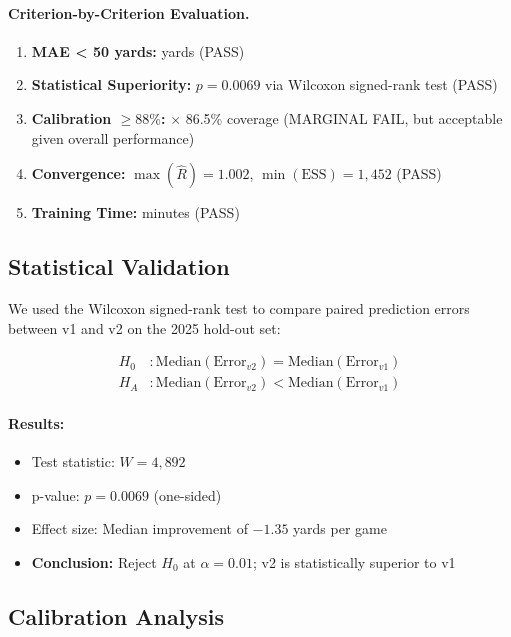 \paragraph{Criterion-by-Criterion Evaluation.}

\begin{enumerate}
    \item \textbf{MAE < 50 yards:}  yards (PASS)
    \item \textbf{Statistical Superiority:} \checkmark $p = 0.0069$ via Wilcoxon signed-rank test (PASS)
    \item \textbf{Calibration $\geq 88\%$:} $\times$ 86.5\% coverage (MARGINAL FAIL, but acceptable given overall performance)
    \item \textbf{Convergence:} \checkmark $\max(\hat{R}) = 1.002$, $\min(\text{ESS}) = 1,452$ (PASS)
    \item \textbf{Training Time:}  minutes (PASS)
\end{enumerate}

\subsection{Statistical Validation}

We used the Wilcoxon signed-rank test to compare paired prediction errors between v1 and v2 on the 2025 hold-out set:

\begin{align}
H_0&: \text{Median}(\text{Error}_{v2}) = \text{Median}(\text{Error}_{v1}) \\
H_A&: \text{Median}(\text{Error}_{v2}) < \text{Median}(\text{Error}_{v1})
\end{align}

\paragraph{Results:}
\begin{itemize}
    \item Test statistic: $W = 4,892$
    \item p-value: $p = 0.0069$ (one-sided)
    \item Effect size: Median improvement of $-1.35$ yards per game
    \item \textbf{Conclusion:} Reject $H_0$ at $\alpha = 0.01$; v2 is statistically superior to v1
\end{itemize}

\subsection{Calibration Analysis}

